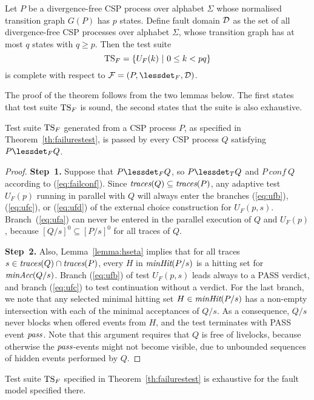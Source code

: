  
\begin{theorem}\label{th:failurestest}
Let $P$ be a divergence-free CSP process over alphabet $\Sigma$ whose
normalised transition graph $G(P)$ has $p$ states. Define fault domain ${\cal
D}$ as the set of all divergence-free CSP processes over alphabet $\Sigma$,
whose transition graph has at most $q$ states with $q \ge p$. Then the test
suite
\[
{\text{TS}}_F = \{ U_F(k)~|~0 \le k < pq  \}
\]
is complete with respect to ${\cal F} = (P,\lessdet_F,{\cal D})$.
\end{theorem}
%
The proof of the theorem follows from the two lemmas below. The first states
that test suite ${\text{TS}}_F$ is sound, the second states that the suite is also
exhaustive.
%
\begin{lemma}\label{lemma:mainfsound}
Test suite ${\text{TS}}_F$ generated from a CSP process $P$, as specified in
Theorem~\ref{th:failurestest}, is passed by every CSP process $Q$ satisfying
$P\lessdet_F Q$.
\end{lemma}
\begin{proof}
{\bf Step~1.} Suppose that $P\lessdet_F Q$, so $P\lessdet_T Q$ and  $P\ conf\
Q$ according to (\ref{eq:failconf}). Since   $\text{\it traces}(Q)\subseteq \text{\it traces}(P)$,
any adaptive test $U_F(p)$ running in parallel with $Q$ will always enter the
branches (\ref{eq:ufb}), (\ref{eq:ufc}), or (\ref{eq:ufd}) of the external
choice construction for $U_F(p,s)$. Branch~(\ref{eq:ufa}) can never be
entered in the parallel execution of $Q$ and $U_F(p)$, because
$[Q/s]^0\subseteq [P/s]^0$ for all traces of $Q$.

{\bf Step~2.} Also,  Lemma~\ref{lemma:hseta} implies that for all traces
$s\in\text{\it traces}(Q)\cap\text{\it traces}(P)$, every $H$ in $\text{\it minHit}(P/s)$ is a hitting set for
$\text{\it minAcc}(Q/s)$. Branch (\ref{eq:ufb}) of test $U_F(p,s)$ leads always to a
PASS verdict, and branch (\ref{eq:ufc}) to test continuation without a
verdict. For the last branch, we note that any selected minimal hitting set
$H\in\text{\it minHit}(P/s)$ has a non-empty intersection with each of the minimal
acceptances of $Q/s$. As a consequence, $Q/s$ never blocks when offered
events from $H$, and the test terminates with PASS event ${\text{\it pass}}$. Note that
this argument requires that $Q$ is free of livelocks, because otherwise the
${\text{\it pass}}$-events might not become visible, due to unbounded sequences of
hidden events performed by $Q$. \xbox
\end{proof}
%
\begin{lemma}\label{lemma:mainfexhaustive}
Test suite ${\text{TS}}_F$ specified in Theorem~\ref{th:failurestest} is exhaustive
for the fault model specified there.
\end{lemma}
